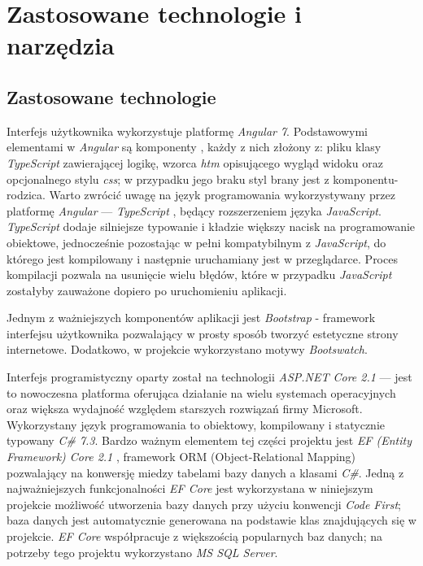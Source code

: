 \documentclass[eng,printmode,openany]{mgr}
\begin{document}
\chapter{Zastosowane technologie i narzędzia}
\section{Zastosowane technologie}
Interfejs użytkownika wykorzystuje platformę \textit{Angular 7}. Podstawowymi elementami w \textit{Angular} są komponenty \cite{angular-components}, każdy z nich złożony z: pliku klasy \textit{TypeScript} zawierającej logikę, wzorca \textit{htm} opisującego wygląd widoku oraz opcjonalnego stylu \textit{css}; w przypadku jego braku styl brany jest z komponentu-rodzica. Warto zwrócić uwagę na język programowania wykorzystywany przez platformę \textit{Angular} — \textit{TypeScript} \cite{msdn-ts}, będący rozszerzeniem języka \textit{JavaScript}. \textit{TypeScript} dodaje silniejsze typowanie i kładzie większy nacisk na programowanie obiektowe, jednocześnie pozostając w pełni kompatybilnym z \textit{JavaScript}, do którego jest kompilowany i  następnie uruchamiany jest w przeglądarce. Proces kompilacji pozwala na usunięcie wielu błędów, które w przypadku \textit{JavaScript} zostałyby zauważone dopiero po uruchomieniu aplikacji.

Jednym z ważniejszych komponentów aplikacji jest \textit{Bootstrap} - framework interfejsu użytkownika pozwalający w prosty sposób tworzyć estetyczne strony internetowe. Dodatkowo, w projekcie wykorzystano motywy \textit{Bootswatch}.

Interfejs programistyczny oparty został na technologii \textit{ASP.NET Core 2.1} — jest to nowoczesna platforma oferująca działanie na wielu systemach operacyjnych oraz większa wydajność względem starszych rozwiązań firmy Microsoft. Wykorzystany język programowania to obiektowy, kompilowany i statycznie typowany \textit{C\# 7.3}. Bardzo ważnym elementem tej części projektu jest \textit{EF (Entity Framework) Core 2.1} \cite{msdn-efcore}, framework ORM (Object-Relational Mapping) pozwalający na konwersję miedzy tabelami bazy danych a klasami \textit{C\#}. Jedną z najważniejszych funkcjonalności \textit{EF Core} jest wykorzystana w niniejszym projekcie możliwość utworzenia bazy danych przy użyciu konwencji \textit{Code First}; baza danych jest automatycznie generowana na podstawie klas  znajdujących się w projekcie. \textit{EF Core} współpracuje z większością popularnych baz danych; na potrzeby tego projektu wykorzystano \textit{MS SQL Server}.
\end{document}

